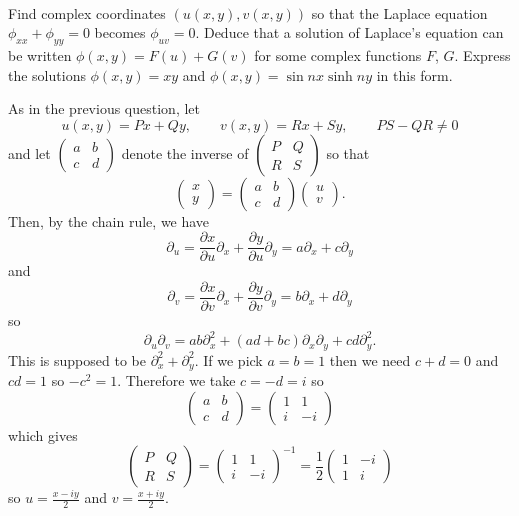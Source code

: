 \documentclass[12pt]{article}
\begin{document}
\bigskip

\begin{question}\ \\
Find complex coordinates $(u(x,y),v(x,y))$ so that the Laplace equation $\phi_{xx}+\phi_{yy}=0$ becomes $\phi_{uv}=0$. Deduce that a solution of Laplace's equation can be written $\phi(x,y)=F(u)+G(v)$ for some complex functions $F$, $G$. Express the solutions $\phi(x,y)=xy$ and $\phi(x,y)=\sin nx\sinh ny$ in this form.
\end{question}

\iffalse
\begin{answer}
As in the previous question, let
\[u(x,y)=Px+Qy,\qquad v(x,y)=Rx+Sy,\qquad PS-QR\neq 0\]
and let $\left(\begin{array}{cc}a & b \\ c & d\end{array}\right)$ denote the inverse of $\left(\begin{array}{cc}P & Q \\ R & S\end{array}\right)$ so that
\[\left(\begin{array}{c}x \\ y \end{array}\right)=\left(\begin{array}{cc}a & b \\ c & d\end{array}\right)\left(\begin{array}{c}u \\ v\end{array}\right).\]
Then, by the chain rule, we have
\[\partial_u=\frac{\partial x}{\partial u}\partial_x+\frac{\partial y}{\partial u}\partial_y=a\partial_x+c\partial_y\]
and
\[\partial_v=\frac{\partial x}{\partial v}\partial_x+\frac{\partial y}{\partial v}\partial_y=b\partial_x+d\partial_y\]
so
\[\partial_u\partial_v=ab\partial_x^2+(ad+bc)\partial_x\partial_y+cd\partial_y^2.\]
This is supposed to be $\partial_x^2+\partial_y^2$. If we pick $a=b=1$ then we need $c+d=0$ and $cd=1$ so $-c^2=1$. Therefore we take $c=-d=i$ so
\[\left(\begin{array}{cc}a & b \\ c & d\end{array}\right)=\left(\begin{array}{cc}1 & 1 \\ i & -i\end{array}\right)\]
which gives
\[\left(\begin{array}{cc}P & Q \\ R & S\end{array}\right)=\left(\begin{array}{cc}1 & 1 \\ i & -i\end{array}\right)^{-1}=\frac{1}{2}\left(\begin{array}{cc}1 & -i \\ 1 & i\end{array}\right)\]
so $u=\frac{x-iy}{2}$ and $v=\frac{x+iy}{2}$.


\end{answer}
\end{document}
